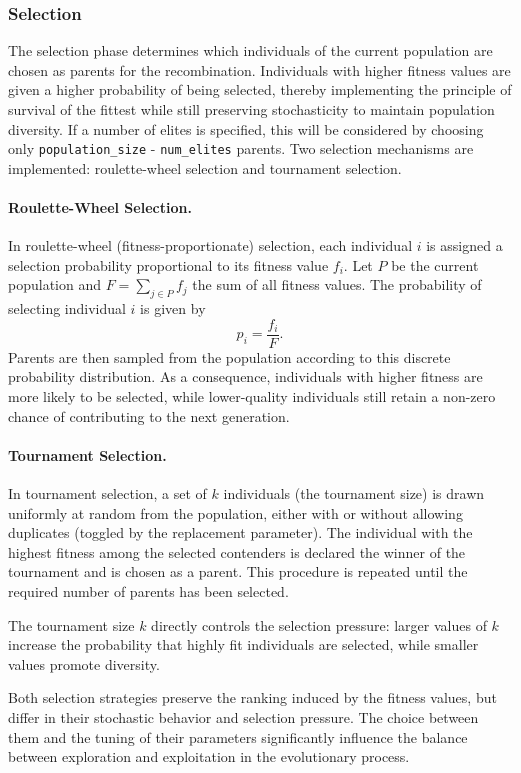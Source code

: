 \documentclass[12pt]{article}
\begin{document}
\subsubsection{Selection}

The selection phase determines which individuals of the current population are chosen as parents for the recombination. Individuals with higher fitness values are given a higher probability of being selected, thereby implementing the principle of survival of the fittest while still preserving stochasticity to maintain population diversity. If a number of elites is specified, this will be considered by choosing only \texttt{population\_size} - \texttt{num\_elites} parents. Two selection mechanisms are implemented: roulette-wheel selection and tournament selection.

\paragraph{Roulette-Wheel Selection.}
In roulette-wheel (fitness-proportionate) selection, each individual $i$ is assigned a selection probability proportional to its fitness value $f_i$. Let $P$ be the current population and $F = \sum_{j \in P} f_j$ the sum of all fitness values. The probability of selecting individual $i$ is given by
\[
p_i = \frac{f_i}{F}.
\]
Parents are then sampled from the population according to this discrete probability distribution. As a consequence, individuals with higher fitness are more likely to be selected, while lower-quality individuals still retain a non-zero chance of contributing to the next generation.

\paragraph{Tournament Selection.}
In tournament selection, a set of $k$ individuals (the tournament size) is drawn uniformly at random from the population, either with or without allowing duplicates (toggled by the replacement parameter). The individual with the highest fitness among the selected contenders is declared the winner of the tournament and is chosen as a parent. This procedure is repeated until the required number of parents has been selected.

The tournament size $k$ directly controls the selection pressure: larger values of $k$ increase the probability that highly fit individuals are selected, while smaller values promote diversity.

Both selection strategies preserve the ranking induced by the fitness values, but differ in their stochastic behavior and selection pressure. The choice between them and the tuning of their parameters significantly influence the balance between exploration and exploitation in the evolutionary process.
\end{document}
